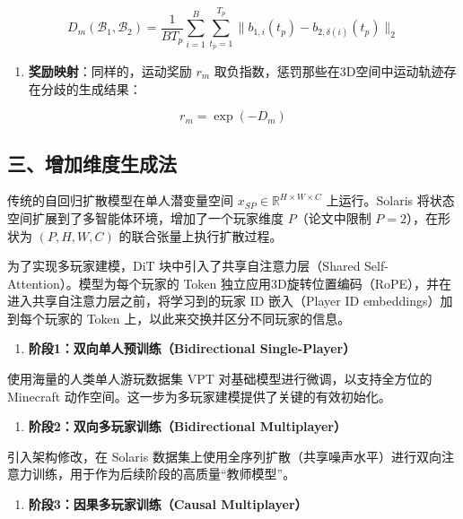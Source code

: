 \[
D_m(\mathcal{B}_1,\mathcal{B}_2)=\frac{1}{BT_p}\sum_{i=1}^{B}\sum_{t_p=1}^{T_p}\lVert b_{1,i}(t_p)-b_{2,\delta(i)}(t_p)\rVert_2
\]

\begin{enumerate}
\def\labelenumi{\arabic{enumi}.}
\setcounter{enumi}{2}
\tightlist
\item
  \textbf{奖励映射}：同样的，运动奖励 \(r_m\) 取负指数，惩罚那些在3D空间中运动轨迹存在分歧的生成结果：
\end{enumerate}

\[
r_m = \exp(-D_m)
\]

\hypertarget{ux4e09ux589eux52a0ux7ef4ux5ea6ux751fux6210ux6cd5}{%
\subsection{三、增加维度生成法}\label{ux4e09ux589eux52a0ux7ef4ux5ea6ux751fux6210ux6cd5}}

传统的自回归扩散模型在单人潜变量空间 \(x_{SP}\in \mathbb{R}^{H\times W\times C}\) 上运行。Solaris 将状态空间扩展到了多智能体环境，增加了一个玩家维度 \(P\)（论文中限制 \(P=2\)），在形状为 \((P,H,W,C)\) 的联合张量上执行扩散过程。

为了实现多玩家建模，DiT 块中引入了共享自注意力层（Shared Self-Attention）。模型为每个玩家的 Token 独立应用3D旋转位置编码（RoPE），并在进入共享自注意力层之前，将学习到的玩家 ID 嵌入（Player ID embeddings）加到每个玩家的 Token 上，以此来交换并区分不同玩家的信息。

\begin{enumerate}
\def\labelenumi{\arabic{enumi}.}
\tightlist
\item
  \textbf{阶段1：双向单人预训练（Bidirectional Single-Player）}
\end{enumerate}

使用海量的人类单人游玩数据集 VPT 对基础模型进行微调，以支持全方位的 Minecraft 动作空间。这一步为多玩家建模提供了关键的有效初始化。

\begin{enumerate}
\def\labelenumi{\arabic{enumi}.}
\setcounter{enumi}{1}
\tightlist
\item
  \textbf{阶段2：双向多玩家训练（Bidirectional Multiplayer）}
\end{enumerate}

引入架构修改，在 Solaris 数据集上使用全序列扩散（共享噪声水平）进行双向注意力训练，用于作为后续阶段的高质量``教师模型''。

\begin{enumerate}
\def\labelenumi{\arabic{enumi}.}
\setcounter{enumi}{2}
\tightlist
\item
  \textbf{阶段3：因果多玩家训练（Causal Multiplayer）}
\end{enumerate}


